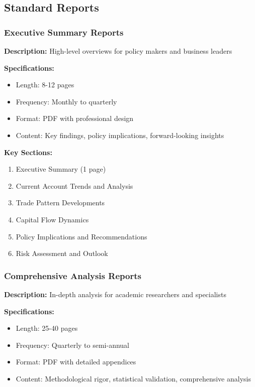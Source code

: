 \documentclass[11pt,a4paper]{article}
\begin{document}
\subsection{Standard Reports}

\subsubsection{Executive Summary Reports}
\textbf{Description:} High-level overviews for policy makers and business leaders

\textbf{Specifications:}
\begin{itemize}
    \item Length: 8-12 pages
    \item Frequency: Monthly to quarterly
    \item Format: PDF with professional design
    \item Content: Key findings, policy implications, forward-looking insights
\end{itemize}

\textbf{Key Sections:}
\begin{enumerate}
    \item Executive Summary (1 page)
    \item Current Account Trends and Analysis
    \item Trade Pattern Developments
    \item Capital Flow Dynamics
    \item Policy Implications and Recommendations
    \item Risk Assessment and Outlook
\end{enumerate}

\subsubsection{Comprehensive Analysis Reports}
\textbf{Description:} In-depth analysis for academic researchers and specialists

\textbf{Specifications:}
\begin{itemize}
    \item Length: 25-40 pages
    \item Frequency: Quarterly to semi-annual
    \item Format: PDF with detailed appendices
    \item Content: Methodological rigor, statistical validation, comprehensive analysis
\end{itemize}
\end{document}
